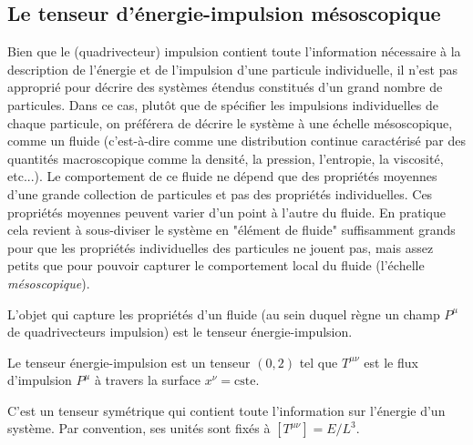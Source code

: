 \subsection{Le tenseur d'énergie-impulsion mésoscopique}
Bien que le (quadrivecteur) impulsion contient toute l'information nécessaire à la description de l'énergie et de l'impulsion d'une particule individuelle, il n'est pas approprié pour décrire des systèmes étendus constitués d'un grand nombre de particules. Dans ce cas, plutôt que de spécifier les impulsions individuelles de chaque particule, on préférera de décrire le système à une échelle mésoscopique, comme un fluide (c'est-à-dire comme une distribution continue caractérisé par des quantités macroscopique comme la densité, la pression, l'entropie, la viscosité, etc...). Le comportement de ce fluide ne dépend que des propriétés moyennes d'une grande collection de particules et pas des propriétés individuelles. Ces propriétés moyennes peuvent varier d'un point à l'autre du fluide. En pratique cela revient à sous-diviser le système en "élément de fluide" suffisamment grands pour que les propriétés individuelles des particules ne jouent pas, mais assez petits que pour pouvoir capturer le comportement local du fluide (l'échelle \emph{mésoscopique}). 

L'objet qui capture les propriétés d'un fluide (au sein duquel règne un champ $P^{\mu}$ de quadrivecteurs impulsion) est le tenseur énergie-impulsion.
\begin{theoremframe}
    \begin{defi}
        Le tenseur énergie-impulsion est un tenseur $(0,2)$ tel que $T^{\mu \nu} $ est le flux d'impulsion $P^{\mu}$ à travers la surface $x^{\nu} = \text{cste}$.
    \end{defi}
\end{theoremframe}
C'est un tenseur symétrique qui contient toute l'information sur l'énergie d'un système. Par convention, ses unités sont fixés à $[T^{\mu\nu}] = E/L^3$.
